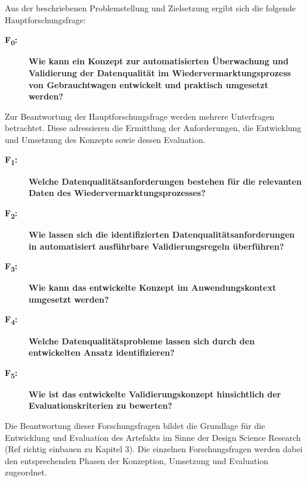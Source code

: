 \documentclass[../main.tex]{subfiles}
\begin{document}
Aus der beschriebenen Problemstellung und Zielsetzung ergibt sich die folgende Hauptforschungsfrage:
\begin{description} 
    \item[\textbf{F\textsubscript{0}:}] \textbf{Wie kann ein Konzept zur automatisierten Überwachung und Validierung der Datenqualität im Wiedervermarktungsprozess von Gebrauchtwagen entwickelt und praktisch umgesetzt werden?} 
    \label{rq:f0} 
\end{description}

Zur Beantwortung der Hauptforschungsfrage werden mehrere Unterfragen betrachtet. Diese adressieren die Ermittlung der Anforderungen, die Entwicklung und Umsetzung des Konzepts sowie dessen Evaluation.
\begin{description} 
    \item[\textbf{F\textsubscript{1}:}] \textbf{Welche Datenqualitätsanforderungen bestehen für die relevanten Daten des Wiedervermarktungsprozesses?} 
    \label{rq:f1} 
\end{description} 

\begin{description} 
    \item[\textbf{F\textsubscript{2}:}] \textbf{Wie lassen sich die identifizierten Datenqualitätsanforderungen in automatisiert ausführbare Validierungsregeln überführen?} 
    \label{rq:f2} 
\end{description} 

\begin{description} 
    \item[\textbf{F\textsubscript{3}:}] \textbf{Wie kann das entwickelte Konzept im Anwendungskontext umgesetzt werden?}
    \label{rq:f3} 
\end{description} 

\begin{description} 
    \item[\textbf{F\textsubscript{4}:}] \textbf{Welche Datenqualitätsprobleme lassen sich durch den entwickelten Ansatz identifizieren?} 
    \label{rq:f4} 
\end{description} 

\begin{description} 
    \item[\textbf{F\textsubscript{5}:}] \textbf{Wie ist das entwickelte Validierungskonzept hinsichtlich der Evaluationskriterien zu bewerten?} 
    \label{rq:f5} 
\end{description}

Die Beantwortung dieser Forschungsfragen bildet die Grundlage für die Entwicklung und Evaluation des Artefakts im Sinne der Design Science Research (Ref richtig einbauen zu Kapitel 3). Die einzelnen Forschungsfragen werden dabei den entsprechenden Phasen der Konzeption, Umsetzung und Evaluation zugeordnet.
\end{document}
